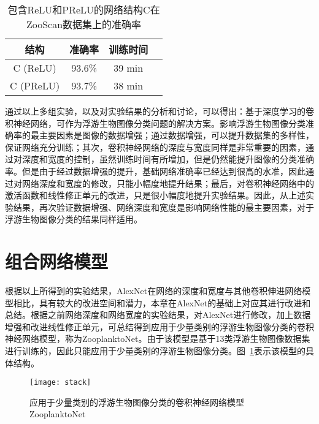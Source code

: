 \begin{table}[H]
\centering
\caption{包含ReLU和PReLU的网络结构C在ZooScan数据集上的准确率}
\label{tab:re}
\begin{tabular}{|c|c|c|c|}
\hline 结构 & 准确率 & 训练时间\\
\hline C (ReLU) & 93.6\% & 39 min \\
\hline C (PReLU) & 93.7\% & 38 min \\
\hline 
\end{tabular}
\end{table}

通过以上多组实验，以及对实验结果的分析和讨论，可以得出：基于深度学习的卷积神经网络，可作为浮游生物图像分类问题的解决方案。影响浮游生物图像分类准确率的最主要因素是图像的数据增强；通过数据增强，可以提升数据集的多样性，保证网络充分训练；其次，卷积神经网络的深度与宽度同样是非常重要的因素，通过对深度和宽度的控制，虽然训练时间有所增加，但是仍然能提升图像的分类准确率。但是由于经过数据增强的提升，基础网络准确率已经达到很高的水准，因此通过对网络深度和宽度的修改，只能小幅度地提升结果；最后，对卷积神经网络中的激活函数和线性修正单元的改进，只是很小幅度地提升实验结果。因此，从上述实验结果，再次验证数据增强、网络深度和宽度是影响网络性能的最主要因素，对于浮游生物图像分类的结果同样适用。



\section{组合网络模型}

根据以上所得到的实验结果，AlexNet在网络的深度和宽度与其他卷积伸进网络模型相比，具有较大的改进空间和潜力，本章在AlexNet的基础上对应其进行改进和总结。根据之前网络深度和网络宽度的实验结果，对AlexNet进行修改，加上数据增强和改进线性修正单元，可总结得到应用于少量类别的浮游生物图像分类的卷积神经网络模型，称为ZooplanktoNet。由于该模型是基于13类浮游生物图像数据集进行训练的，因此只能应用于少量类别的浮游生物图像分类。图~\ref{fig:stack}表示该模型的具体结构。

\begin{figure}[H] %
  \centering
  \texttt{[image: stack]}
  \caption{应用于少量类别的浮游生物图像分类的卷积神经网络模型ZooplanktoNet}
  \label{fig:stack}
\end{figure}


